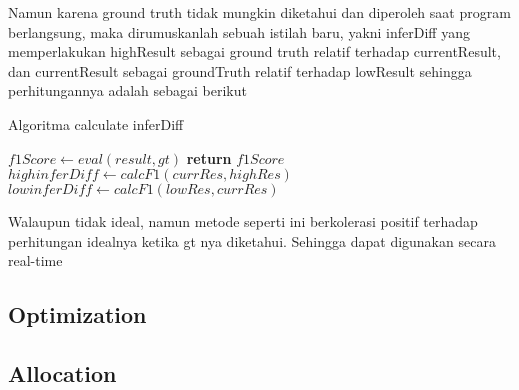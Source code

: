         Namun karena ground truth tidak mungkin diketahui dan diperoleh saat program berlangsung, maka dirumuskanlah sebuah istilah baru, yakni inferDiff
        yang memperlakukan highResult sebagai ground truth relatif terhadap currentResult, dan currentResult sebagai groundTruth relatif terhadap lowResult
        sehingga perhitungannya adalah sebagai berikut

        \begin{algorithm}[tbh]
        \caption{Algoritma calculate inferDiff}\label{alg:inferDiff}
        \begin{algorithmic}[1]
            \State $f1Score \gets eval(result, gt)$
            \State \textbf{return} $f1Score$
        \EndFunction
        \State $highinferDiff \gets calcF1(currRes, highRes)$
        \State $lowinferDiff \gets calcF1(lowRes, currRes)$
        \end{algorithmic}
        \end{algorithm}

        Walaupun tidak ideal, namun metode seperti ini berkolerasi positif terhadap perhitungan idealnya ketika gt nya diketahui. 
        Sehingga dapat digunakan secara real-time
        






            


    \subsection{Optimization}


    \subsection{Allocation}



